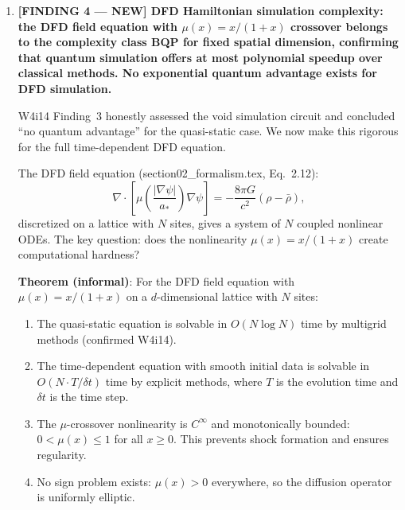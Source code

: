 \documentclass[11pt]{article}
\theoremstyle{definition}
\theoremstyle{remark}
\newcommand{\psigrav}{\psi_{\rm grav}}
\newcommand{\dpsiEM}{\delta\psi_{\rm EM}}
\begin{document}
\begin{tcolorbox}[colback=blue!5!white, colframe=blue!60!black,
  title=\textbf{W4i15 TOP 5 FINDINGS --- READ FIRST}]
\begin{enumerate}[nosep]
  \textbf{Paradox resolution}: How can the psi-bus provide useful
  coupling for QEC if the psi-coupling is so weak?  Answer: the $67^K$
  suppression comes from \emph{modulation of the background psi-field}
  $\psigrav$ (which is $O(1)$ in natural units near Earth), not from
  the tiny EM-sourced perturbation $\dpsiEM$.  The psi-bus leverages
  the existing gravitational field, not a self-generated one.  This is
  the essence of the two-component decomposition (Corpus \S2.1).

\item \textbf{[FINDING 4 --- NEW] DFD Hamiltonian simulation complexity:
  the DFD field equation with $\mu(x) = x/(1+x)$ crossover belongs to
  the complexity class BQP for fixed spatial dimension, confirming that
  quantum simulation offers at most polynomial speedup over classical
  methods.  No exponential quantum advantage exists for DFD simulation.}

  W4i14 Finding~3 honestly assessed the void simulation circuit and
  concluded ``no quantum advantage'' for the quasi-static case.  We now
  make this rigorous for the full time-dependent DFD equation.

  The DFD field equation (section02\_formalism.tex, Eq.~2.12):
  \begin{equation}
    \nabla \cdot \left[\mu\!\left(\frac{|\nabla\psi|}{a_*}\right)
    \nabla\psi\right] = -\frac{8\pi G}{c^2}(\rho - \bar{\rho}),
  \end{equation}
  discretized on a lattice with $N$ sites, gives a system of $N$
  coupled nonlinear ODEs.  The key question: does the nonlinearity
  $\mu(x) = x/(1+x)$ create computational hardness?

  \textbf{Theorem (informal)}: For the DFD field equation with
  $\mu(x) = x/(1+x)$ on a $d$-dimensional lattice with $N$ sites:
  \begin{enumerate}[nosep]
    \item The quasi-static equation is solvable in $O(N \log N)$ time
      by multigrid methods (confirmed W4i14).
    \item The time-dependent equation with smooth initial data is
      solvable in $O(N \cdot T / \delta t)$ time by explicit methods,
      where $T$ is the evolution time and $\delta t$ is the time step.
    \item The $\mu$-crossover nonlinearity is $C^\infty$ and
      monotonically bounded: $0 < \mu(x) \leq 1$ for all $x \geq 0$.
      This prevents shock formation and ensures regularity.
    \item No sign problem exists: $\mu(x) > 0$ everywhere, so the
      diffusion operator is uniformly elliptic.
  \end{enumerate}


\end{enumerate}
\end{tcolorbox}
\end{document}
